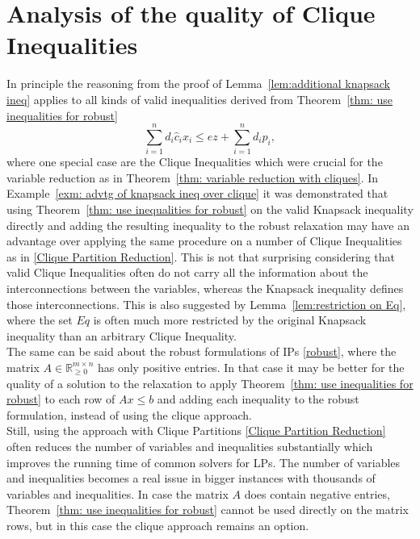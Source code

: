 \documentclass[titlepage, a4paper]{amsbook}
\theoremstyle{plain}
\theoremstyle{break}
\theoremstyle{definition}
\theoremstyle{remark}
\numberwithin{equation}{thm}
\begin{document}
\section{Analysis of the quality of Clique Inequalities}
In principle the reasoning from the proof of Lemma~\ref{lem:additional knapsack ineq} applies to all kinds of valid inequalities derived from Theorem~\ref{thm: use inequalities for robust}
\[\sum_{i=1}^n d_i \hat{c}_i x_i \leq e z + \sum_{i=1}^n d_i p_i,\]
where one special case are the Clique Inequalities which were crucial for the variable reduction as in Theorem~\ref{thm: variable reduction with cliques}. In Example~\ref{exm: advtg of knapsack ineq over clique} it was demonstrated that using Theorem~\ref{thm: use inequalities for robust} on the valid Knapsack inequality directly and adding the resulting inequality to the robust relaxation may have an advantage over applying the same procedure on a number of Clique Inequalities as in \eqref{Clique Partition Reduction}.
This is not that surprising considering that valid Clique Inequalities often do not carry all the information about the interconnections between the variables, whereas the Knapsack inequality defines those interconnections. This is also suggested by Lemma~\ref{lem:restriction on Eq}, where the set $Eq$ is often much more restricted by the original Knapsack inequality than an arbitrary Clique Inequality. \\
The same can be said about the robust formulations of IPs
\eqref{robust}, where the matrix $A \in \mathbb{R}^{m \times n}_{\geq 0}$ has only positive entries. In that case it may be better for the quality of a solution to the relaxation to apply Theorem~\ref{thm: use inequalities for robust} to each row of $Ax \leq b$ and adding each inequality to the robust formulation, instead of using the clique approach.  \\
Still, using the approach with Clique Partitions \eqref{Clique Partition Reduction} often reduces the number of variables and inequalities substantially which improves the running time of common solvers for LPs. The number of variables and inequalities becomes a real issue in bigger instances with thousands of variables and inequalities. In case the matrix $A$ does contain negative entries, Theorem~\ref{thm: use inequalities for robust} cannot be used directly on the matrix rows, but in this case the clique approach remains an option.  
\end{document}
